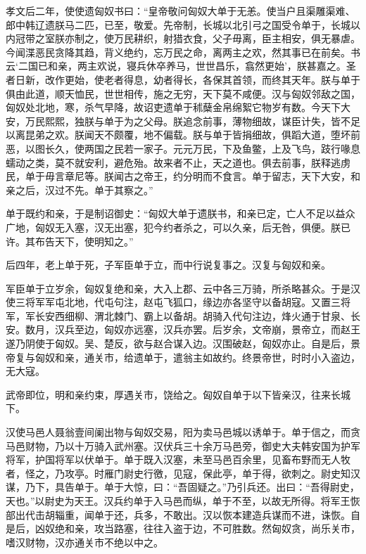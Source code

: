 \documentclass[12pt,UTF8]{ctexbook}
\begin{document}
孝文后二年，使使遗匈奴书曰：“皇帝敬问匈奴大单于无恙。使当户且渠雕渠难、郎中韩辽遗朕马二匹，已至，敬爱。先帝制，长城以北引弓之国受令单于，长城以内冠带之室朕亦制之，使万民耕织，射猎衣食，父子毋离，臣主相安，俱无暴虐。今闻渫恶民贪降其趋，背义绝约，忘万民之命，离两主之欢，然其事已在前矣。书云‘二国已和亲，两主欢说，寝兵休卒养马，世世昌乐，翕然更始’，朕甚嘉之。圣者日新，改作更始，使老者得息，幼者得长，各保其首领，而终其天年。朕与单于俱由此道，顺天恤民，世世相传，施之无穷，天下莫不咸便。汉与匈奴邻敌之国，匈奴处北地，寒，杀气早降，故诏吏遗单于秫蘖金帛绵絮它物岁有数。今天下大安，万民熙熙，独朕与单于为之父母。朕追念前事，薄物细故，谋臣计失，皆不足以离昆弟之欢。朕闻天不颇覆，地不偏载。朕与单于皆捐细故，俱蹈大道，堕坏前恶，以图长久，使两国之民若一家子。元元万民，下及鱼鳖，上及飞鸟，跂行喙息蠕动之类，莫不就安利，避危殆。故来者不止，天之道也。俱去前事，朕释逃虏民，单于毋言章尼等。朕闻古之帝王，约分明而不食言。单于留志，天下大安，和亲之后，汉过不先。单于其察之。”



单于既约和亲，于是制诏御史：“匈奴大单于遗朕书，和亲已定，亡人不足以益众广地，匈奴无入塞，汉无出塞，犯今约者杀之，可以久亲，后无咎，俱便。朕已许。其布告天下，使明知之。”



后四年，老上单于死，子军臣单于立，而中行说复事之。汉复与匈奴和亲。



军臣单于立岁余，匈奴复绝和亲，大入上郡、云中各三万骑，所杀略甚众。于是汉使三将军军屯北地，代屯句注，赵屯飞狐口，缘边亦各坚守以备胡寇。又置三将军，军长安西细柳、渭北棘门、霸上以备胡。胡骑入代句注边，烽火通于甘泉、长安。数月，汉兵至边，匈奴亦远塞，汉兵亦罢。后岁余，文帝崩，景帝立，而赵王遂乃阴使于匈奴。吴、楚反，欲与赵合谋入边。汉围破赵，匈奴亦止。自是后，景帝复与匈奴和亲，通关市，给遗单于，遣翁主如故约。终景帝世，时时小入盗边，无大寇。



武帝即位，明和亲约束，厚遇关市，饶给之。匈奴自单于以下皆亲汉，往来长城下。



汉使马邑人聂翁壹间阑出物与匈奴交易，阳为卖马邑城以诱单于。单于信之，而贪马邑财物，乃以十万骑入武州塞。汉伏兵三十余万马邑旁，御史大夫韩安国为护军将军，护国将军以伏单于。单于既入汉塞，未至马邑百余里，见畜布野而无人牧者，怪之，乃攻亭。时雁门尉史行徼，见寇，保此亭，单于得，欲刺之。尉史知汉谋，乃下，具告单于。单于大惊，曰：“吾固疑之。”乃引兵还。出曰：“吾得尉史，天也。”以尉史为天王。汉兵约单于入马邑而纵，单于不至，以故无所得。将军王恢部出代击胡辎重，闻单于还，兵多，不敢出。汉以恢本建造兵谋而不进，诛恢。自是后，凶奴绝和亲，攻当路塞，往往入盗于边，不可胜数。然匈奴贪，尚乐关市，嗜汉财物，汉亦通关市不绝以中之。
\end{document}
